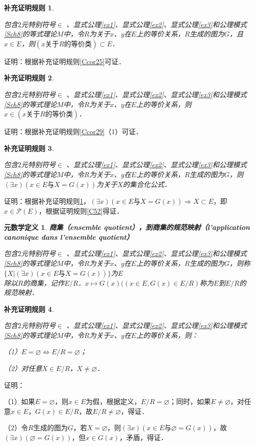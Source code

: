 \documentclass[12pt, a4paper, oneside]{book}
\newtheorem{metadef}{元数学定义}
\newtheorem{Ccor}{补充证明规则}
\begin{document}
			\begin{Ccor}\label{Ccor31}
				\hfill\par
				包含$2$元特别符号$\in$ 、显式公理\ref{ex1}、显式公理\ref{ex2}、显式公理\ref{ex3}和公理模式\ref{Sch8}的等式理论$M$中，令$R$为关于$x$、$y$在$E$上的等价关系，$R$生成的图为$G$，且$x\in E$，则$(x\text{关于}R\text{的等价类})\subset E$．
			\end{Ccor}
			证明：根据补充证明规则\ref{Ccor25}可证．

			\begin{Ccor}\label{Ccor32}
				\hfill\par
				包含$2$元特别符号$\in$ 、显式公理\ref{ex1}、显式公理\ref{ex2}、显式公理\ref{ex3}和公理模式\ref{Sch8}的等式理论$M$中，令$R$为关于$x$、$y$在$E$上的等价关系，则$x\in(x\text{关于}R\text{的等价类})$．
			\end{Ccor}
			证明：根据补充证明规则\ref{Ccor29}（1）可证．

			\begin{Ccor}\label{Ccor33}
				\hfill\par
				包含$2$元特别符号$\in$ 、显式公理\ref{ex1}、显式公理\ref{ex2}、显式公理\ref{ex3}和公理模式\ref{Sch8}的等式理论$M$中，令$R$为关于$x$、$y$在$E$上的等价关系，$R$生成的图为$G$，则$(\exists x)(x\in E\text{与}X=G(x))$为关于$X$的集合化公式．
			\end{Ccor}
			证明：根据补充证明规则\ref{Ccor31}，$(\exists x)(x\in E\text{与}X=G(x))\Rightarrow X\subset E$，即$x\in \mathcal{P}(E)$，根据证明规则\ref{C52}得证．

			\begin{metadef}
				\textbf{商集（ensemble quotient），到商集的规范映射（l'application canonique dans l'ensemble quotient）}
				\par
				包含$2$元特别符号$\in$ 、显式公理\ref{ex1}、显式公理\ref{ex2}、显式公理\ref{ex3}和公理模式\ref{Sch8}的等式理论$M$中，令$R$为关于$x$、$y$在$E$上的等价关系，$R$生成的图为$G$，则称$\{X|(\exists x)(x\in E\text{与}X=G(x))\}$为$E$\\除以$R$的商集，记作$E/R$．$x\mapsto G(x)((x\in E, G(x)\in E/R)$称为$E$到$E/R$的规范映射．
			\end{metadef}

			\begin{Ccor}\label{Ccor34}
				\hfill\par
				包含$2$元特别符号$\in$ 、显式公理\ref{ex1}、显式公理\ref{ex2}、显式公理\ref{ex3}和公理模式\ref{Sch8}的等式理论$M$中，令$R$为关于$x$、$y$在$E$上的等价关系，则：
				\par
				（1）$E=\varnothing\Leftrightarrow E/R=\varnothing$；
				\par
				（2）对任意$X\in E/R$，$X\neq \varnothing$．
			\end{Ccor}
			证明：
			\par
			（1）如果$E=\varnothing$，则$x\in E$为假，根据定义，$E/R=\varnothing$；同时，如果$E\neq \varnothing$，对任意$x\in E$，$G(x)\in E/R$，故$E/R\neq \varnothing$，得证．
			\par
			（2）令$R$生成的图为$G$，若$X=\varnothing$，则$(\exists x)(x\in E\text{与}\varnothing=G(x))$，故$(\exists x)(\varnothing=G(x))$，但$x\in G(x)$，矛盾，得证．
\end{document}
